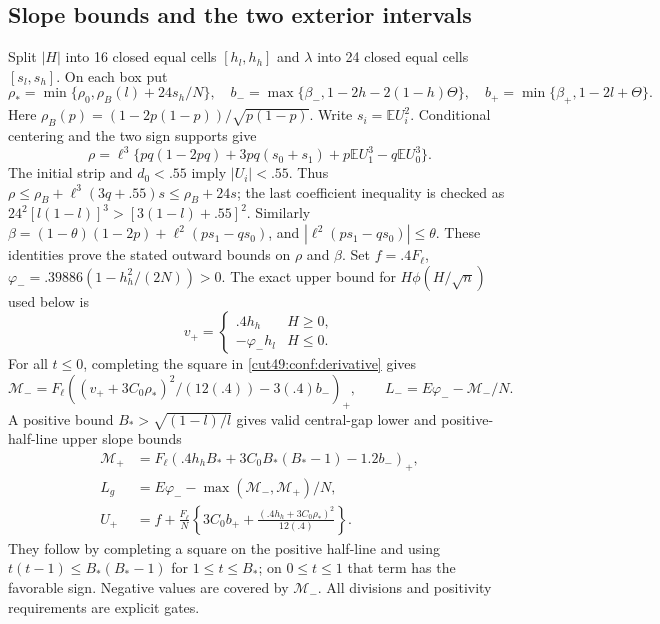 \documentclass[11pt,a4paper]{article}
\numberwithin{equation}{section}
\theoremstyle{definition}
\theoremstyle{remark}
\newcommand{\E}{\mathbb E}
\newcommand{\pos}[1]{(#1)_+}
\begin{document}
\subsection{Slope bounds and the two exterior intervals}
Split $|H|$ into 16 closed equal cells $[h_l,h_h]$ and $\lambda$ into
24 closed equal cells $[s_l,s_h]$. On each box put
\[
 \rho_* =\min\{\rho_0,\rho_B(l)+24s_h/N\},\quad
 b_- =\max\{\beta_-,1-2h-2(1-h)\Theta\},\quad
 b_+ =\min\{\beta_+,1-2l+\Theta\}.
\]
Here $\rho_B(p)=(1-2p(1-p))/\sqrt{p(1-p)}$. Write $s_i=\E U_i^2$. Conditional centering and the two sign supports give
\[
 \rho=\ell^3\{pq(1-2pq)+3pq(s_0+s_1)
                  +p\E U_1^3-q\E U_0^3\}.
\]
The initial strip and $d_0<.55$ imply $|U_i|<.55$.
Thus $\rho\le\rho_B+\ell^3(3q+.55)s\le\rho_B+24s$; the last
coefficient inequality is checked as
$24^2[l(1-l)]^3>[3(1-l)+.55]^2$.
Similarly $\beta=(1-\theta)(1-2p)+\ell^2(ps_1-qs_0)$, and
$|\ell^2(ps_1-qs_0)|\le\theta$. These identities prove the stated
outward bounds on $\rho$ and $\beta$.
Set $f=.4F_\ell$, $\varphi_-=.39886(1-h_h^2/(2N))>0$.
The exact upper bound for $H\phi(H/\sqrt n)$ used below is
\[
 v_+=\begin{cases}.4h_h&H\ge0,\\-\varphi_-h_l&H\le0.\end{cases}
\]
For all $t\le0$, completing the square in \eqref{cut49:conf:derivative} gives
\[
 \mathcal M_-=F_\ell\pos{(v_++3C_0\rho_*)^2/(12(.4))-3(.4)b_-},
 \qquad L_-=E\varphi_- -\mathcal M_-/N.
\]
A positive bound $B_*>\sqrt{(1-l)/l}$ gives valid central-gap lower
and positive-half-line upper slope bounds
\begin{align*}
 \mathcal M_+&=F_\ell\pos{.4h_hB_*+3C_0B_*(B_*-1)-1.2b_-},\\
 L_g&=E\varphi_--\max(\mathcal M_-,\mathcal M_+)/N,\\
 U_+&=f+\frac{F_\ell}{N}
 \left\{3C_0b_++\frac{(.4h_h+3C_0\rho_*)^2}{12(.4)}\right\}.
\end{align*}
They follow by completing a square on the positive half-line and using
$t(t-1)\le B_*(B_*-1)$ for $1\le t\le B_*$; on $0\le t\le1$ that
term has the favorable sign. Negative values are covered by $\mathcal M_-$.
All divisions and positivity requirements are explicit gates.
\end{document}
